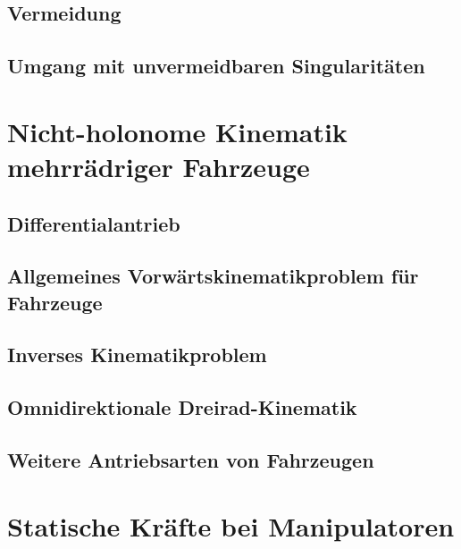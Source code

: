 \documentclass[a4paper, 11pt, accentcolor = tud3b]{tudreport}
\begin{document}
			\subsection{Vermeidung} %

			\subsection{Umgang mit unvermeidbaren Singularitäten} %

		\section{Nicht-holonome Kinematik mehrrädriger Fahrzeuge} %

			\subsection{Differentialantrieb} %

			\subsection{Allgemeines Vorwärtskinematikproblem für Fahrzeuge} %

			\subsection{Inverses Kinematikproblem} %

			\subsection{Omnidirektionale Dreirad-Kinematik} %

			\subsection{Weitere Antriebsarten von Fahrzeugen} %

		\section{Statische Kräfte bei Manipulatoren} %
\end{document}
